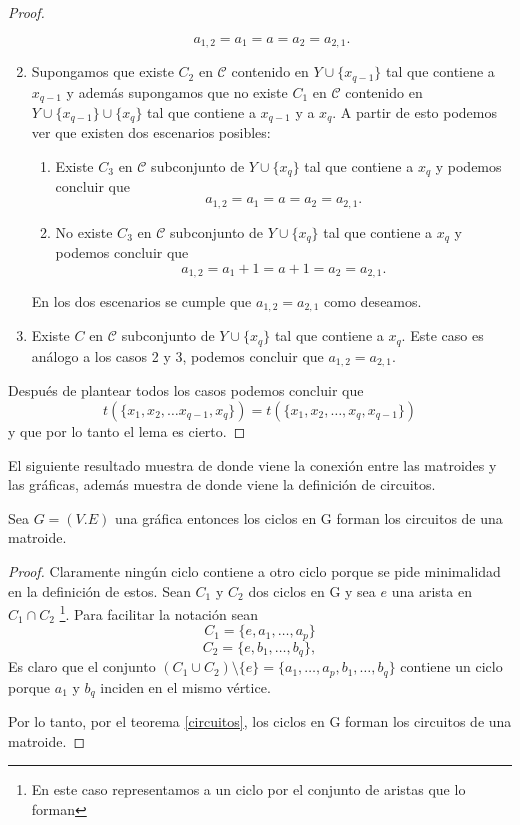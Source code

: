 \begin{proof}
\begin{enumerate}
$$a_{1,2}=a_1 =a=a_2 = a_{2,1}.$$
\item Supongamos que existe $C_2$ en $\mathcal{C}$ contenido en $Y \cup \{ x_{q-1}\}$ tal que contiene a $x_{q-1}$ y además supongamos que no existe $C_1$ en $\mathcal{C}$ contenido en $Y \cup \{ x_{q-1}\} \cup \{x_q\}$ tal que contiene a $x_{q-1}$ y a $x_q$. A partir de esto podemos ver que existen dos escenarios posibles: 
\begin{enumerate}
\item Existe $C_3$ en $\mathcal{C}$ subconjunto de $Y \cup \{ x_{q}\}$ tal que contiene a $x_{q}$ y podemos concluir que 
$$a_{1,2}=a_1 =a=a_2 = a_{2,1}.$$
\item No existe $C_3$ en $\mathcal{C}$ subconjunto de $Y \cup \{ x_{q}\}$ tal que contiene a $x_{q}$ y podemos concluir que 
$$a_{1,2}=a_1 +1 = a + 1= a_2 = a_{2,1}.$$
\end{enumerate}
En los dos escenarios se cumple que $a_{1,2}=a_{2,1}$ como deseamos. 
\item Existe $C$ en $\mathcal{C}$ subconjunto de $Y \cup \{x_q\}$ tal que contiene a $x_q$. Este caso es análogo a los casos 2 y 3, podemos concluir que $a_{1,2}=a_{2,1}$. 
\end{enumerate}
Después de plantear todos los casos podemos concluir que $$t(\{x_1,x_2,\dots x_{q-1},x_q\}) = t(\{x_1,x_2,\dots,x_q,x_{q-1}\}) $$ y que por lo tanto el lema es cierto.
\end{proof}


El siguiente resultado muestra de donde viene la conexión entre las matroides y las gráficas, además muestra de donde viene la definición de circuitos.

\begin{teo}
Sea $G=(V.E)$ una gráfica entonces los ciclos en G forman los circuitos de una matroide. 
\end{teo}
\begin{proof}
Claramente ningún ciclo contiene a otro ciclo porque se pide minimalidad en la definición de estos. Sean $C_1$ y $C_2$ dos ciclos en G y sea $e$ una arista en $C_1 \cap C_2$ \footnote{En este caso representamos a un ciclo por el conjunto de aristas que lo forman}. Para facilitar la notación sean 
$$C_1 = \{ e, a_1, \dots, a_p\} $$
$$C_2 = \{e,b_1,\dots, b_q \},$$
Es claro que el conjunto $(C_1 \cup C_2) \setminus \{e\}= \{ a_1, \dots, a_p, b_1,\dots, b_q\}$ contiene un ciclo porque $a_1$ y $b_q$ inciden en el mismo vértice. 

Por lo tanto, por el teorema \ref{circuitos}, los ciclos en G forman los circuitos de una matroide.
\end{proof}

